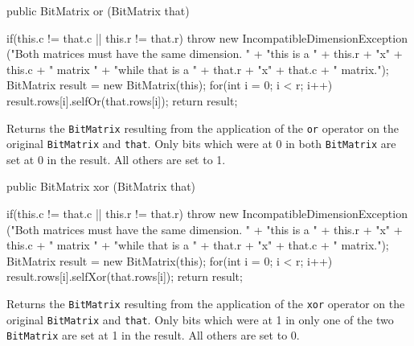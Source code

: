 \begin{htmlonly}
\end{htmlonly}
\begin{code}

   public BitMatrix or (BitMatrix that) \begin{hide} {
      if(this.c != that.c || this.r != that.r)
         throw new IncompatibleDimensionException
         ("Both matrices must have the same dimension. " +
          "this is a " + this.r + "x" + this.c + " matrix " +
          "while that is a " + that.r + "x" + that.c + " matrix.");
      BitMatrix result = new BitMatrix(this);
      for(int i = 0; i < r; i++)
         result.rows[i].selfOr(that.rows[i]);
      return result;
   } \end{hide}
\end{code}
\begin{tabb} Returns the \texttt{BitMatrix} resulting from the application of
  the \texttt{or} operator on the original \texttt{BitMatrix} and \texttt{that}.
  Only bits which were at 0 in both \texttt{BitMatrix} are set at 0 in the
  result. All others are set to 1.
\end{tabb}
\begin{htmlonly}
\end{htmlonly}
\begin{code}

   public BitMatrix xor (BitMatrix that) \begin{hide} {
      if(this.c != that.c || this.r != that.r)
         throw new IncompatibleDimensionException
         ("Both matrices must have the same dimension. " +
          "this is a " + this.r + "x" + this.c + " matrix " +
          "while that is a " + that.r + "x" + that.c + " matrix.");
      BitMatrix result = new BitMatrix(this);
      for(int i = 0; i < r; i++)
         result.rows[i].selfXor(that.rows[i]);
      return result;
   } \end{hide}
\end{code}
\begin{tabb} Returns the \texttt{BitMatrix} resulting from the application of
  the \texttt{xor} operator on the original \texttt{BitMatrix} and \texttt{that}.
  Only bits which were at 1 in only one of the two \texttt{BitMatrix} are set
  at 1 in the result. All others are set to 0.
\end{tabb}
